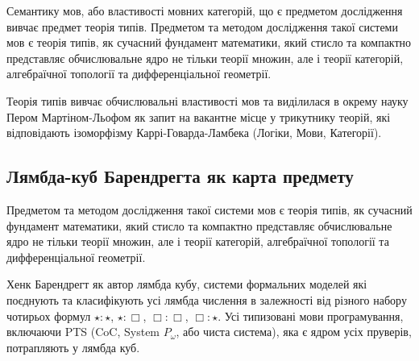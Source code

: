 Семантику мов, або властивості мовних категорій, що є предметом
дослідження вивчає предмет теорія типів. Предметом та методом
дослідження такої системи мов є теорія типів, як сучасний фундамент
математики, який стисло та компактно представляє обчислювальне ядро
не тільки теорії множин, але і теорії категорій, алгебраїчної
топології та дифференціальної геометрії.

Теорія типів вивчає обчислювальні властивості мов та виділилася
в окрему науку Пером Мартіном-Льофом як запит на вакантне місце
у трикутнику теорій, які відповідають ізоморфізму
Каррі-Говарда-Ламбека (Логіки, Мови, Категорії).

\newpage
\subsection*{Лямбда-куб Барендрегта як карта предмету}
Предметом та методом дослідження такої системи мов є теорія типів,
як сучасний фундамент математики, який стисло та компактно представляє
обчислювальне ядро не тільки теорії множин,
але і теорії категорій, алгебраїчної топології та дифференціальної геометрії.

Хенк Барендрегт як автор лямбда кубу, системи формальних
моделей які поєднують та класифікують усі лямбда числення в
залежності від різного набору чотирьох формул $\star : \star$,
$\star : \Box$, $\Box : \Box$, $\Box : \star$. Усі типизовані мови
програмування, включаючи PTS (CoC, System $P_\omega$, або чиста система),
яка є ядром усіх пруверів, потрапляють у лямбда куб.

\begin{center}
\end{center}

